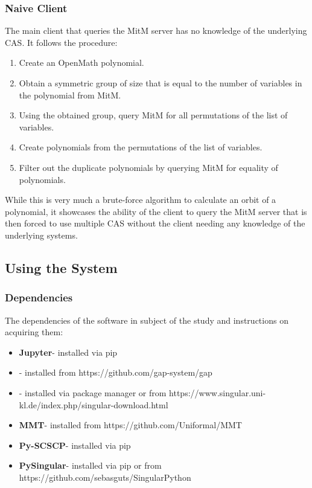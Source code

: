 \subsubsection{Naive Client}

The main client that queries the MitM server has no knowledge of the underlying 
CAS. It follows the procedure:
\begin{enumerate}
  \item Create an OpenMath polynomial.
  \item Obtain a symmetric group of size that is equal to the number of variables 
    in the polynomial from MitM.
  \item Using the obtained group, query MitM for all permutations of the list 
    of variables.
  \item Create polynomials from the permutations of the list of variables.
  \item Filter out the duplicate polynomials by querying MitM for equality of 
    polynomials.
\end{enumerate}
While this is very much a brute-force algorithm to calculate an orbit of a
polynomial, it showcases the ability of the client to query the MitM server that 
is then forced to use multiple CAS without the client needing any knowledge of the
underlying systems.

\subsection{Using the System}

\subsubsection{Dependencies}
The dependencies of the software in subject of the study and instructions on
acquiring them:
\begin{itemize}
  \item \textbf{Jupyter}- installed via pip
  \item \textbf{\GAP}- installed from https://github.com/gap-system/gap
  \item \textbf{\Singular}- installed via package manager or from
    https://www.singular.uni-kl.de/index.php/singular-download.html
  \item \textbf{MMT}- installed from https://github.com/Uniformal/MMT
  \item \textbf{Py-SCSCP}- installed via pip
  \item \textbf{PySingular}- installed via pip or from 
    https://github.com/sebasguts/SingularPython
\end{itemize}

